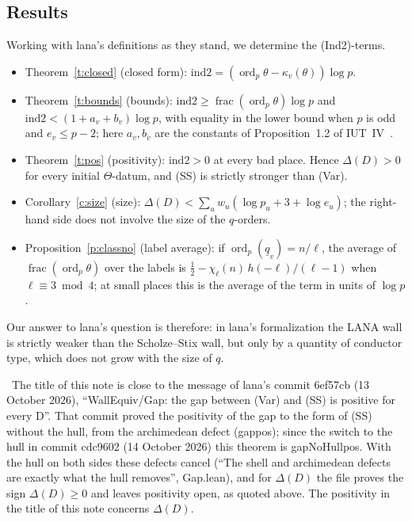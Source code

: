 \documentclass[11pt,a4paper]{article}
\newcommand{\ordp}{\operatorname{ord}_p}
\newcommand{\fr}{\operatorname{frac}}
\newcommand{\qb}{\underline{q}}
\newcommand{\itwo}{\mathrm{ind2}}
\newcommand{\leanus}{\textunderscore\allowbreak}
\newcommand{\lean}[1]{{\ttfamily\let\_\leanus #1}}
\newcommand{\lab}[2]{{\upshape\fcolorbox{#1}{#1!8}{\scriptsize\sffamily\bfseries\textcolor{#1}{#2}}}}
\newcommand{\tagX}{\lab{Purple}{X}}
\newcommand{\q}[1]{``#1''}
\theoremstyle{plain}
\theoremstyle{definition}
\theoremstyle{remark}
\begin{document}
\subsection{Results}
Working with lana's definitions as they stand, we determine the (Ind2)-terms.
\begin{itemize}
\item Theorem~\ref{t:closed} (closed form): $\itwo=(\ordp\theta-\kappa_v(\theta))\log p$.
\item Theorem~\ref{t:bounds} (bounds): $\itwo\ge\fr(\ordp\theta)\log p$ and $\itwo<(1+a_v+b_v)\log p$, with equality in
the lower bound when $p$ is odd and $e_v\le p-2$; here $a_v,b_v$ are the constants of Proposition~1.2 of
IUT~IV~\cite{IUT4}.
\item Theorem~\ref{t:pos} (positivity): $\itwo>0$ at every bad place. Hence $\Delta(D)>0$ for every initial
$\Theta$-datum, and (SS) is strictly stronger than (Var).
\item Corollary~\ref{c:size} (size): $\Delta(D)<\sum_uw_u(\log p_u+3+\log e_u)$; the right-hand side does not involve
the size of the $q$-orders.
\item Proposition~\ref{p:classno} (label average): if $\ordp(\qb_v)=n/\ell$, the average of $\fr(\ordp\theta)$ over the
labels is $\tfrac12-\chi_\ell(n)\,h(-\ell)/(\ell-1)$ when $\ell\equiv3\bmod4$; at small places this is the average of
the term in units of $\log p$.
\end{itemize}
Our answer to lana's question is therefore: in lana's formalization the LANA wall is strictly weaker than the
Scholze--Stix wall, but only by a quantity of conductor type, which does not grow with the size of $q$.

\tagX\ The title of this note is close to the message of lana's commit \lean{6ef57cb} (13 October 2026),
\q{WallEquiv/Gap: the gap between (Var) and (SS) is positive for every D}. That commit proved the positivity of the
gap to the form of (SS) without the hull, from the archimedean defect (\lean{gap\_pos}); since the switch to the
hull in commit \lean{cdc9602} (14 October 2026) this theorem is \lean{gapNoHull\_pos}. With the hull on both sides
these defects cancel (\q{The shell and archimedean defects are exactly what the hull removes}, \lean{Gap.lean}), and
for $\Delta(D)$ the file proves the sign $\Delta(D)\ge0$ and leaves positivity open, as quoted above. The positivity in
the title of this note concerns $\Delta(D)$.
\end{document}
